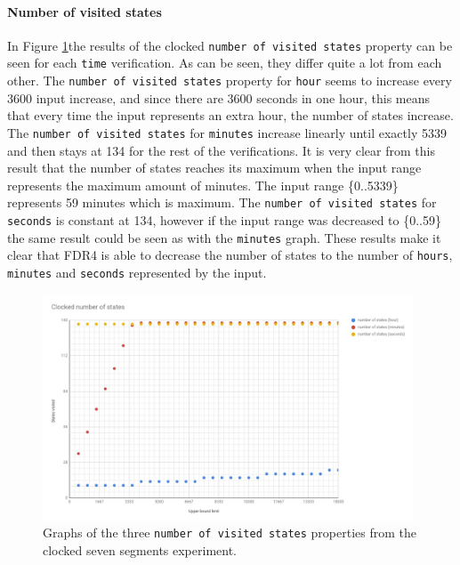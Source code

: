 \paragraph{Number of visited states}
In Figure \ref{fig:clocked_states}the results of the clocked \texttt{number of visited states} property can be seen for each \texttt{time} verification. As can be seen, they differ quite a lot from each other. The \texttt{number of visited states} property for \texttt{hour} seems to increase every 3600 input increase, and since there are 3600 seconds in one hour, this means that every time the input represents an extra hour, the number of states increase. The \texttt{number of visited states} for \texttt{minutes} increase linearly until exactly 5339 and then stays at 134 for the rest of the verifications. It is very clear from this result that the number of states reaches its maximum when the input range represents the maximum amount of minutes. The input range \{0..5339\} represents 59 minutes which is maximum. The \texttt{number of visited states} for \texttt{seconds} is constant at 134, however if the input range was decreased to \{0..59\} the same result could be seen as with the \texttt{minutes} graph. These results make it clear that FDR4 is able to decrease the number of states to the number of \texttt{hours}, \texttt{minutes} and \texttt{seconds} represented by the input.
\begin{figure}
    \includegraphics[width=0.98\textwidth]{./figures/temporary_figures/clocked_number_of_states.jpg}
\caption{Graphs of the three \texttt{number of visited states} properties from the clocked seven segments experiment.}
\label{fig:clocked_states}
\end{figure}
